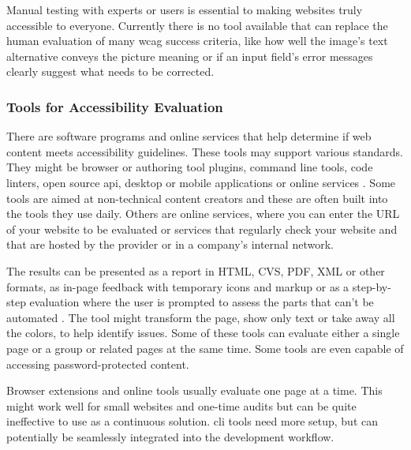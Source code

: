 \documentclass{master_thesis}
\begin{document}
Manual testing with experts or users is essential to making websites truly accessible to everyone. Currently there is no tool available that can replace the human evaluation of many \ac{wcag} success criteria, like how well the image's text alternative conveys the picture meaning or if an input field's error messages clearly suggest what needs to be corrected.


\subsubsection{Tools for Accessibility Evaluation}

There are software programs and online services that help determine if web content meets accessibility guidelines. These tools may support various standards. They might be browser or authoring tool plugins, command line tools, code linters, open source \ac{api}, desktop or mobile applications or online services \citep{AbouZahra2017}. Some tools are aimed at non-technical content creators and these are often built into the tools they use daily. Others are online services, where you can enter the URL of your website to be evaluated or services that regularly check your website and that are hosted by the provider or in a company's internal network.

The results can be presented as a report in HTML, CVS, PDF, XML or other formats, as in-page feedback with temporary icons and markup or as a step-by-step evaluation where the user is prompted to assess the parts that can't be automated \citep{AbouZahra2017}. The tool might transform the page, show only text or take away all the colors, to help identify issues. Some of these tools can evaluate either a single page or a group or related pages at the same time. Some tools are even capable of accessing password-protected content.

Browser extensions and online tools usually evaluate one page at a time. This might work well for small websites and one-time audits but can be quite ineffective to use as a continuous solution. \Ac{cli} tools need more setup, but can potentially be seamlessly integrated into the development workflow.
\end{document}
